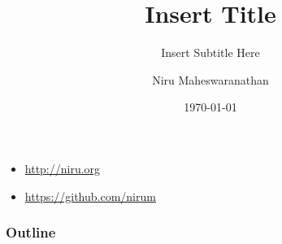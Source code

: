 \documentclass[t]{beamer}
\title{Insert Title}
\subtitle{Insert Subtitle Here}
\author{Niru Maheswaranathan}
\institute{Stanford University}
\date{\today}
\begin{document}
\begin{frame}
\titlepage
\begin{itemize}
\item 	\url{http://niru.org}
\item   \url{https://github.com/nirum}
\end{itemize}
\end{frame}

\begin{frame}
\frametitle{Outline}
\tableofcontents
\end{frame}


\end{document}
